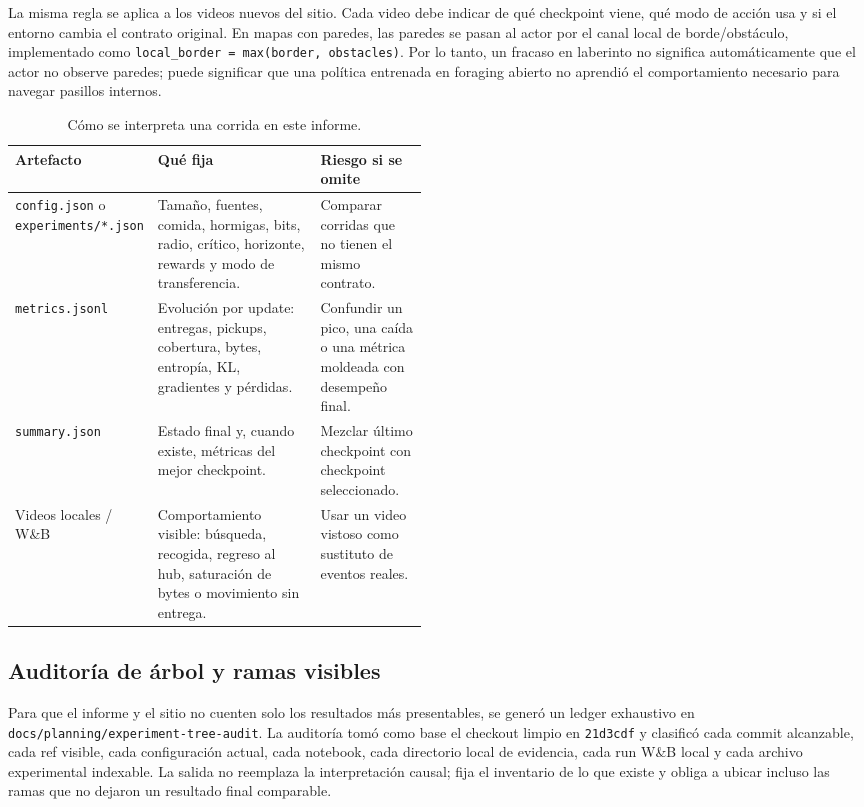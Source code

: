 \documentclass[11pt,a4paper]{article}
\newcommand{\run}[1]{\nolinkurl{#1}}
\begin{document}
La misma regla se aplica a los videos nuevos del sitio. Cada video debe indicar de qué checkpoint viene, qué modo de acción usa y si el entorno cambia el contrato original. En mapas con paredes, las paredes se pasan al actor por el canal local de borde/obstáculo, implementado como \run{local_border = max(border, obstacles)}. Por lo tanto, un fracaso en laberinto no significa automáticamente que el actor no observe paredes; puede significar que una política entrenada en foraging abierto no aprendió el comportamiento necesario para navegar pasillos internos.

\begin{table}[h]
\centering
\caption{Cómo se interpreta una corrida en este informe.}
\begin{tabularx}{\linewidth}{>{\raggedright\arraybackslash}p{0.22\linewidth}X>{\raggedright\arraybackslash}p{0.26\linewidth}}
\toprule
Artefacto & Qué fija & Riesgo si se omite \\
\midrule
\run{config.json} o \run{experiments/*.json} & Tamaño, fuentes, comida, hormigas, bits, radio, crítico, horizonte, rewards y modo de transferencia. & Comparar corridas que no tienen el mismo contrato. \\
\run{metrics.jsonl} & Evolución por update: entregas, pickups, cobertura, bytes, entropía, KL, gradientes y pérdidas. & Confundir un pico, una caída o una métrica moldeada con desempeño final. \\
\run{summary.json} & Estado final y, cuando existe, métricas del mejor checkpoint. & Mezclar último checkpoint con checkpoint seleccionado. \\
Videos locales / W\&B & Comportamiento visible: búsqueda, recogida, regreso al hub, saturación de bytes o movimiento sin entrega. & Usar un video vistoso como sustituto de eventos reales. \\
\bottomrule
\end{tabularx}
\end{table}

\subsection{Auditoría de árbol y ramas visibles}

Para que el informe y el sitio no cuenten solo los resultados más presentables, se generó un ledger exhaustivo en \run{docs/planning/experiment-tree-audit}. La auditoría tomó como base el checkout limpio en \run{21d3cdf} y clasificó cada commit alcanzable, cada ref visible, cada configuración actual, cada notebook, cada directorio local de evidencia, cada run W\&B local y cada archivo experimental indexable. La salida no reemplaza la interpretación causal; fija el inventario de lo que existe y obliga a ubicar incluso las ramas que no dejaron un resultado final comparable.
\end{document}
